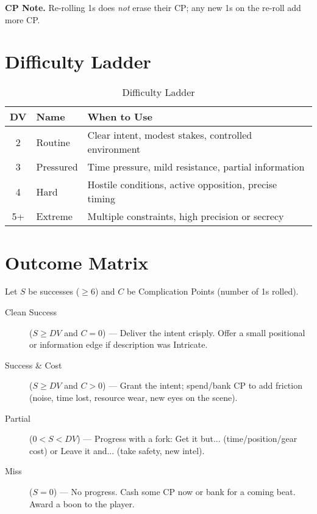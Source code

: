 \noindent\textbf{CP Note.} Re-rolling 1s does \emph{not} erase their CP; any new 1s on the re-roll add more CP.

\section{Difficulty Ladder}

\begin{table}[htbp]
\centering
\begin{tabular}{cll}
\toprule
\textbf{DV} & \textbf{Name} & \textbf{When to Use} \\
\midrule
2 & Routine & Clear intent, modest stakes, controlled environment \\
3 & Pressured & Time pressure, mild resistance, partial information \\
4 & Hard & Hostile conditions, active opposition, precise timing \\
5+ & Extreme & Multiple constraints, high precision or secrecy \\
\bottomrule
\end{tabular}
\caption{Difficulty Ladder}
\end{table}

\section{Outcome Matrix}

Let $S$ be successes ($\geq 6$) and $C$ be Complication Points (number of 1s rolled).

\begin{description}
\item[Clean Success] ($S \geq DV$ and $C = 0$) --- Deliver the intent crisply. Offer a small positional or information edge if description was Intricate.
\item[Success \& Cost] ($S \geq DV$ and $C > 0$) --- Grant the intent; spend/bank CP to add friction (noise, time lost, resource wear, new eyes on the scene).
\item[Partial] ($0 < S < DV$) --- Progress with a fork: Get it but... (time/position/gear cost) or Leave it and... (take safety, new intel).
\item[Miss] ($S = 0$) --- No progress. Cash some CP now or bank for a coming beat. Award a boon to the player.
\end{description}

